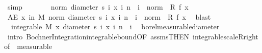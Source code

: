 \begin{isabellebody}
\ simp\isanewline
\ \ \ \ \isamarkupfalse%
\ \isamarkupfalse%
\ {\isachardoublequoteopen}norm\ {\isacharparenleft}{\kern0pt}diameter\ {\isacharbraceleft}{\kern0pt}s\ i\ x\ {\isacharbar}{\kern0pt}i{\isachardot}{\kern0pt}\ n\ {\isasymle}\ i{\isacharbraceright}{\kern0pt}{\isacharparenright}{\kern0pt}\ {\isasymle}\ norm\ {\isacharparenleft}{\kern0pt}{}\ {\isacharasterisk}{\kern0pt}\isactrlsub R\ f\ x{\isacharparenright}{\kern0pt}{\isachardoublequoteclose}\ \isamarkupfalse%
\ {\isacharasterisk}{\kern0pt}\ \isacommand{{\isachardot}{\kern0pt}}\isamarkupfalse%
\isanewline
\ \ \isacommand{{\isacharbraceright}{\kern0pt}}\isamarkupfalse%
\isanewline
\ \ \isamarkupfalse%
\ {\isachardoublequoteopen}AE\ x\ in\ M{\isachardot}{\kern0pt}\ norm\ {\isacharparenleft}{\kern0pt}diameter\ {\isacharbraceleft}{\kern0pt}s\ i\ x\ {\isacharbar}{\kern0pt}i{\isachardot}{\kern0pt}\ n\ {\isasymle}\ i{\isacharbraceright}{\kern0pt}{\isacharparenright}{\kern0pt}\ {\isasymle}\ norm\ {\isacharparenleft}{\kern0pt}{}\ {\isacharasterisk}{\kern0pt}\isactrlsub R\ f\ x{\isacharparenright}{\kern0pt}{\isachardoublequoteclose}\ \isamarkupfalse%
\ blast\isanewline
\ \ \isamarkupfalse%
\ \ {\isachardoublequoteopen}integrable\ M\ {\isacharparenleft}{\kern0pt}{\isasymlambda}x{\isachardot}{\kern0pt}\ diameter\ {\isacharbraceleft}{\kern0pt}s\ i\ x\ {\isacharbar}{\kern0pt}i{\isachardot}{\kern0pt}\ n\ {\isasymle}\ i{\isacharbraceright}{\kern0pt}{\isacharparenright}{\kern0pt}{\isachardoublequoteclose}\ \isamarkupfalse%
\ borel{\isacharunderscore}{\kern0pt}measurable{\isacharunderscore}{\kern0pt}diameter\ \isamarkupfalse%
\ {\isacharparenleft}{\kern0pt}intro\ Bochner{\isacharunderscore}{\kern0pt}Integration{\isachardot}{\kern0pt}integrable{\isacharunderscore}{\kern0pt}bound{\isacharbrackleft}{\kern0pt}OF\ assms{\isacharparenleft}{\kern0pt}{}{\isacharparenright}{\kern0pt}{\isacharbrackleft}{\kern0pt}THEN\ integrable{\isacharunderscore}{\kern0pt}scaleR{\isacharunderscore}{\kern0pt}right{\isacharbrackleft}{\kern0pt}of\ {}{\isacharbrackright}{\kern0pt}{\isacharbrackright}{\kern0pt}{\isacharbrackright}{\kern0pt}{\isacharcomma}{\kern0pt}\ measurable{\isacharparenright}{\kern0pt}\isanewline
{}\isamarkupfalse%
%
\endisatagproof
{\isafoldproof}%
%
\isadelimproof
\isanewline
%
\endisadelimproof
{}\isamarkupfalse%
\ \ \ \ \isanewline
%
\isadelimtheory
\isanewline
%
\endisadelimtheory
%
\isatagtheory
{}\isamarkupfalse%
%
\endisatagtheory
{\isafoldtheory}%
%
\isadelimtheory
%
\endisadelimtheory
%
\end{isabellebody}%
